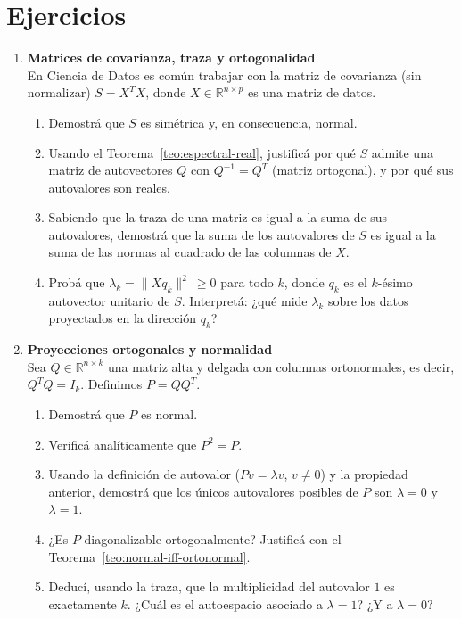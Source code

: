 \section{Ejercicios}
\begin{enumerate}

\item {\bf Matrices de covarianza, traza y ortogonalidad}\\
En Ciencia de Datos es común trabajar con la matriz de covarianza (sin normalizar)
$S = X^{T}X$, donde $X \in \mathbb{R}^{n \times p}$ es una matriz de datos.
\begin{enumerate}[label=\alph*)]
    \item Demostrá que $S$ es simétrica y, en consecuencia, normal.
    \item Usando el Teorema~\ref{teo:espectral-real}, justificá por qué $S$ admite una
          matriz de autovectores $Q$ con $Q^{-1}=Q^{T}$ (matriz ortogonal),
          y por qué sus autovalores son reales.
    \item Sabiendo que la traza de una matriz es igual a la suma de sus autovalores,
          demostrá que la suma de los autovalores de $S$ es igual a la suma de las
          normas al cuadrado de las columnas de $X$.
    \item Probá que $\lambda_k=\|Xq_k\|^{2}\ \ge 0$ para todo $k$, donde $q_k$ es el
          $k$-ésimo autovector unitario de $S$. Interpretá: ¿qué mide $\lambda_k$ sobre
          los datos proyectados en la dirección $q_k$?   %
\end{enumerate}

\item {\bf Proyecciones ortogonales y normalidad}\\
Sea $Q \in \mathbb{R}^{n \times k}$ una matriz alta y delgada con columnas ortonormales,
es decir, $Q^{T}Q = I_k$. Definimos $P = QQ^{T}$.
\begin{enumerate}[label=\alph*)]
    \item Demostrá que $P$ es normal.
    \item Verificá analíticamente que $P^{2}=P$.
    \item Usando la definición de autovalor ($Pv=\lambda v$, $v\neq0$) y la propiedad
          anterior, demostrá que los únicos autovalores posibles de $P$ son
          $\lambda=0$ y $\lambda=1$.
    \item ¿Es $P$ diagonalizable ortogonalmente? Justificá con el
          Teorema~\ref{teo:normal-iff-ortonormal}.
    \item Deducí, usando la traza, que la multiplicidad del autovalor $1$ es exactamente
          $k$. ¿Cuál es el autoespacio asociado a $\lambda=1$? ¿Y a $\lambda=0$?  %
\end{enumerate}


\end{enumerate}
